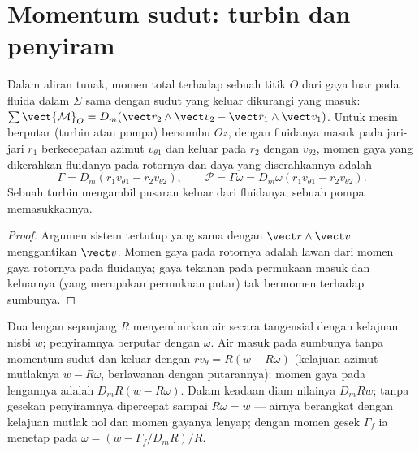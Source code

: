 \section{Momentum sudut: turbin dan penyiram}

\begin{theorem}\label{thm:b2:flow-balances:angular}
Dalam aliran tunak, momen total terhadap sebuah titik $O$ dari gaya luar
pada fluida dalam $\Sigma$ sama dengan  sudut yang
keluar dikurangi yang masuk: $\sum\vect{\mathcal M}_O = D_m(\vect r_2\wedge\vect v_2 - \vect r_1
\wedge\vect v_1)$. Untuk mesin berputar (turbin atau pompa) bersumbu $Oz$,
dengan fluidanya masuk pada jari-jari $r_1$ berkecepatan azimut
$v_{\theta1}$ dan keluar pada $r_2$ dengan $v_{\theta2}$, momen gaya yang dikerahkan
fluidanya pada rotornya dan daya yang diserahkannya adalah
\[
\Gamma = D_m(r_1v_{\theta1} - r_2v_{\theta2}) , \qquad
\mathcal P = \Gamma\omega = D_m\omega(r_1v_{\theta1} - r_2v_{\theta2}) .
\]
Sebuah turbin mengambil pusaran keluar dari fluidanya; sebuah pompa memasukkannya.
\end{theorem}

\begin{proof}
Argumen sistem tertutup yang sama dengan $\vect r\wedge\vect v$ menggantikan
$\vect v$. Momen gaya pada rotornya adalah lawan dari momen gaya
rotornya pada fluidanya; gaya tekanan pada permukaan masuk dan keluarnya
(yang merupakan permukaan putar) tak bermomen terhadap
sumbunya.
\end{proof}

\begin{example}\label{ex:b2:flow-balances:sprinkler}
Dua lengan sepanjang $R$ menyemburkan air secara tangensial dengan kelajuan nisbi
$w$; penyiramnya berputar dengan $\omega$. Air masuk pada sumbunya tanpa
momentum sudut dan keluar dengan $r v_\theta = R(w - R\omega)$ (kelajuan
azimut mutlaknya $w - R\omega$, berlawanan dengan putarannya): momen gaya pada
lengannya adalah $D_mR(w - R\omega)$. Dalam keadaan diam nilainya $D_mRw$; tanpa gesekan
penyiramnya dipercepat sampai $R\omega = w$ --- airnya berangkat dengan kelajuan
mutlak nol dan momen gayanya lenyap; dengan momen gesek
$\Gamma_f$ ia menetap pada $\omega = (w - \Gamma_f/D_mR)/R$.
\end{example}

